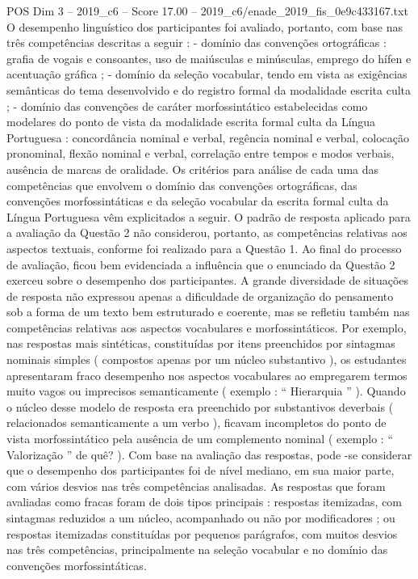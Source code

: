\begin{textsample}{POS Dim 3 – 2019\_c6 – Score 17.00 – 2019\_c6/enade\_2019\_fis\_0e9c433167.txt}
O desempenho linguístico dos participantes foi avaliado, portanto, com base nas três competências descritas a seguir : - domínio das convenções ortográficas : grafia de vogais e consoantes, uso de maiúsculas e minúsculas, emprego do hífen e acentuação gráfica ; - domínio da seleção vocabular, tendo em vista as exigências semânticas do tema desenvolvido e do registro formal da modalidade escrita culta ; - domínio das convenções de caráter morfossintático estabelecidas como modelares do ponto de vista da modalidade escrita formal culta da Língua Portuguesa : concordância nominal e verbal, regência nominal e verbal, colocação pronominal, flexão nominal e verbal, correlação entre tempos e modos verbais, ausência de marcas de oralidade.
Os critérios para análise de cada uma das competências que envolvem o domínio das convenções ortográficas, das convenções morfossintáticas e da seleção vocabular da escrita formal culta da Língua Portuguesa vêm explicitados a seguir.
O padrão de resposta aplicado para a avaliação da Questão 2 não considerou, portanto, as competências relativas aos aspectos textuais, conforme foi realizado para a Questão 1.
Ao final do processo de avaliação, ficou bem evidenciada a influência que o enunciado da Questão 2 exerceu sobre o desempenho dos participantes.
A grande diversidade de situações de resposta não expressou apenas a dificuldade de organização do pensamento sob a forma de um texto bem estruturado e coerente, mas se refletiu também nas competências relativas aos aspectos vocabulares e morfossintáticos.
Por exemplo, nas respostas mais sintéticas, constituídas por itens preenchidos por sintagmas nominais simples ( compostos apenas por um núcleo substantivo ), os estudantes apresentaram fraco desempenho nos aspectos vocabulares ao empregarem termos muito vagos ou imprecisos semanticamente ( exemplo : “ Hierarquia ” ).
Quando o núcleo desse modelo de resposta era preenchido por substantivos deverbais ( relacionados semanticamente a um verbo ), ficavam incompletos do ponto de vista morfossintático pela ausência de um complemento nominal ( exemplo : “ Valorização ” de quê? ).
Com base na avaliação das respostas, pode -se considerar que o desempenho dos participantes foi de nível mediano, em sua maior parte, com vários desvios nas três competências analisadas.
As respostas que foram avaliadas como fracas foram de dois tipos principais : respostas itemizadas, com sintagmas reduzidos a um núcleo, acompanhado ou não por modificadores ; ou respostas itemizadas constituídas por pequenos parágrafos, com muitos desvios nas três competências, principalmente na seleção vocabular e no domínio das convenções morfossintáticas.

\end{textsample}
